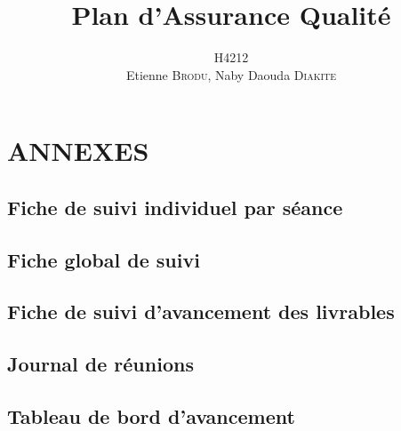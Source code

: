 \documentclass[a4paper,11pt]{article}
\title{Plan d'Assurance Qualité}
\author{H4212\\Etienne \textsc{Brodu}, Naby Daouda \textsc{Diakite}}
\begin{document}
\maketitle
\newpage

\tableofcontents




\section{ANNEXES}

\subsection{Fiche de suivi individuel par séance}
    

\subsection{Fiche global de suivi}
	

\subsection{Fiche de suivi d'avancement des livrables}
    

\subsection{Journal de réunions}
    

\subsection{Tableau de bord d'avancement}
    
\end{document}
